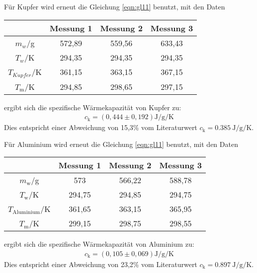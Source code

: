 Für Kupfer wird erneut die Gleichung \eqref{eqn:gl11} benutzt, mit den Daten
\begin{table}
  \centering
  \label{tab:WerteKupfer}
  \begin{tabular}{c c c c}
   \toprule
   & Messung 1 & Messung 2 & Messung 3 \\
   \midrule
   $m_w$/g & 572,89 & 559,56 & 633,43 \\
   $T_w$/K & 294,35 & 294,35 & 294,35 \\
   $T_{Kupfer}$/K & 361,15 & 363,15 & 367,15 \\
   $T_\text{m}$/K & 294,85 & 298,65 & 297,15 \\
   \bottomrule
  \end{tabular}
\end{table}
\FloatBarrier
ergibt sich die spezifische Wärmekapazität von Kupfer zu:
\begin{align*}
  c_\text{k} = \left(0,444 \pm 0,192 \right) \si{\joule\per\gram\per\kelvin}
\end{align*}
Dies entspricht einer Abweichung von 15,3\% vom Literaturwert $c_\text{k} = \SI{0,385}{\joule\per\gram\per\kelvin}$.

Für Aluminium wird erneut die Gleichung \eqref{eqn:gl11} benutzt, mit den Daten
\begin{table}
  \centering
  \label{tab:WerteAluminium}
  \begin{tabular}{c c c c}
   \toprule
   & Messung 1 & Messung 2 & Messung 3 \\
   \midrule
   $m_\text{w}$/g & 573 & 566,22 & 588,78 \\
   $T_\text{w}$/K & 294,75 & 294,85 & 294,75 \\
   $T_\text{Aluminium}$/K & 361,65 & 363,15 & 365,95 \\
   $T_\text{m}$/K & 299,15 & 298,75 & 298,55 \\
   \bottomrule
  \end{tabular}
\end{table}
\FloatBarrier
ergibt sich die spezifische Wärmekapazität von Aluminium zu:
\begin{align*}
  c_\text{k} = \left(0,105 \pm 0,069 \right) \si{\joule\per\gram\per\kelvin}
\end{align*}
Dies entspricht einer Abweichung von 23,2\% vom Literaturwert $c_\text{k} = \SI{0,897}{\joule\per\gram\per\kelvin}$.

